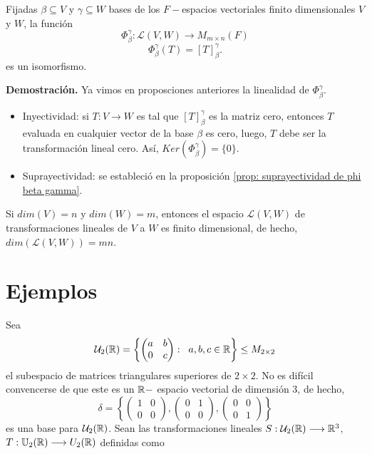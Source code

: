 \begin{prop}
Fijadas $\beta \subseteq V$ y $\gamma \subseteq W$ bases de los
$F-$espacios vectoriales finito dimensionales $V$ y $W$, 
la función 
\[
\Phi_{\beta}^{\gamma} : \mathcal{L}(V, W) \longrightarrow M_{m \times n}(F)
\]
\[
\Phi_{\beta}^{\gamma}(T) = [T]_{\beta}^{\gamma}.
\]
es un isomorfismo.
\end{prop}
\noindent
\textbf{Demostración.}
Ya vimos en proposciones anteriores la linealidad de 
$\Phi_{\beta}^{\gamma}$. 
\begin{itemize}
	\item Inyectividad: si $T: V \longrightarrow W$ es tal que
	$[T]_{\beta}^{\gamma}$ es la matriz cero, entonces $T$
	evaluada en cualquier vector de la base $\beta$ es cero, luego,
	$T$ debe ser la transformación lineal cero. Así,
	$Ker(\Phi_{\beta}^{\gamma}) = \{ 0 \}$.
	
	\item Suprayectividad: se estableció en la proposición 
	\ref{prop: suprayectividad de phi beta gamma}.
\end{itemize}

\QEDB
\vspace{0.2cm}

\begin{cor}
Si $dim(V) = n$ y $dim(W) = m$, entonces el espacio 
$\mathcal{L}(V, W)$ de transformaciones lineales de $V$ a $W$
es finito dimensional, de hecho,
$dim(\mathcal{L}(V, W)) = mn$.
\end{cor}

\section{Ejemplos}
Sea
\[
\mathcal{U}_{2}(\mathbb{R}) = \left\{
\begin{pmatrix}
a & b \\
0 & c
\end{pmatrix}: \hspace{0.2cm}
a, b, c \in \mathbb{R}
\right\} \leq M_{2 \times 2}
\]
el subespacio de matrices triangulares superiores de $2 \times 2$.
No es difícil convencerse de que este es un $\mathbb{R}-$ espacio vectorial
de dimensión $3$, de hecho,
\[
\delta = \left\{
\begin{pmatrix}
1 & 0 \\
0 & 0
\end{pmatrix}, 
\begin{pmatrix}
0 & 1 \\
0 & 0
\end{pmatrix}, 
\begin{pmatrix}
0 & 0 \\
0 & 1
\end{pmatrix}
\right\}
\]
es una base para $\mathcal{U}_{2}(\mathbb{R})$.
Sean las transformaciones lineales
$S : \mathcal{U}_{2}(\mathbb{R}) \longrightarrow \mathbb{R}^{3}$,
$T: \mathbb{U}_{2}(\mathbb{R}) \longrightarrow U_{2}(\mathbb{R})$
definidas como

